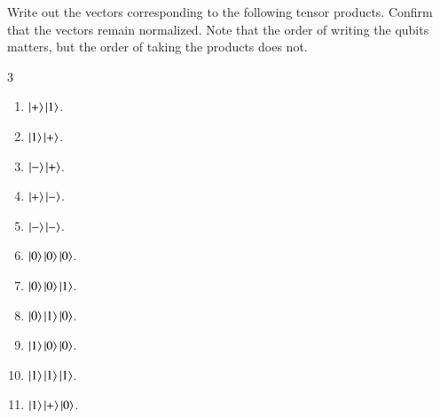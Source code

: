 \begin{exercise}
Write out the vectors corresponding to the following tensor products. Confirm that the vectors remain normalized. Note that the order of writing the qubits matters, but the order of taking the products does not.
\begin{multicols}{3}
    \begin{enumerate}[label=(\alph*)]
    \item $\ket{+}\ket{1}$.
    \item $\ket{1}\ket{+}$.
    \item $\ket{-}\ket{+}$.
    \item $\ket{+}\ket{-}$.
    \item $\ket{-}\ket{-}$.
    \item $\ket{0}\ket{0}\ket{0}$.
    \item $\ket{0}\ket{0}\ket{1}$.
    \item $\ket{0}\ket{1}\ket{0}$.
    \item $\ket{1}\ket{0}\ket{0}$.
    \item $\ket{1}\ket{1}\ket{1}$.
    \item $\ket{1}\ket{+}\ket{0}$.
    \end{enumerate}
\end{multicols}
\end{exercise}

